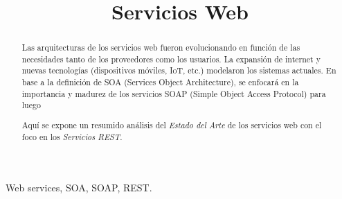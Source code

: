 \documentclass[conference]{IEEEtran}
\begin{document}
%
\title{Servicios Web}

\author{
}



\maketitle


\begin{abstract}
  Las arquitecturas de los servicios web fueron evolucionando en
  función de las necesidades tanto de los proveedores como los
  usuarios. La expansión de internet y nuevas tecnologías
  (dispositivos móviles, IoT, etc.) modelaron los sistemas
  actuales. En base a la definición de SOA (Services Object
  Architecture), se enfocará en la importancia y madurez de los
  servicios SOAP (Simple Object Access Protocol) para luego 



Aquí se expone un resumido análisis del \emph{Estado del
    Arte} de los servicios web con el foco en los \emph{Servicios
    REST}.

\end{abstract}

\begin{IEEEkeywords}
Web services, SOA, SOAP, REST.
\end{IEEEkeywords}



%
\IEEEpeerreviewmaketitle
\end{document}
